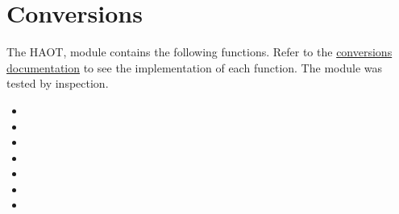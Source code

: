\section{Conversions \label{ch4:conversions}}
The \gls{HAOT},  module contains the following
functions. Refer to the
\href{https://haot.readthedocs.io/en/latest/modules/conversions.html}{conversions documentation}
to see the implementation of each function. The 
module was tested by inspection.
\begin{itemize}
    \item {}
    \item {}
    \item {}
    \item {}
    \item {}
    \item {}
    \item {}
\end{itemize}
